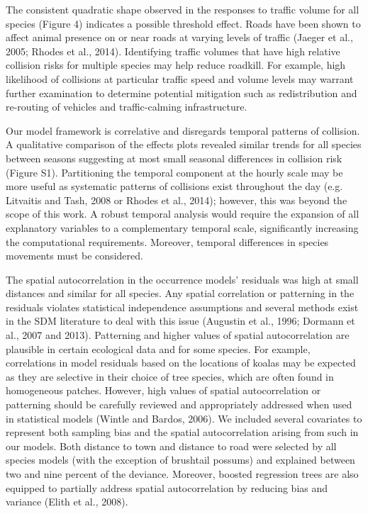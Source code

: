 The consistent quadratic shape observed in the responses to traffic volume for all species (Figure 4) indicates a possible threshold effect.  Roads have been shown to affect animal presence on or near roads at varying levels of traffic (Jaeger et al., 2005; Rhodes et al., 2014).  Identifying traffic volumes that have high relative collision risks for multiple species may help reduce roadkill.  For example, high likelihood of collisions at particular traffic speed and volume levels may warrant further examination to determine potential mitigation such as redistribution and re-routing of vehicles and traffic-calming infrastructure.

Our model framework is correlative and disregards temporal patterns of collision.  A qualitative comparison of the effects plots revealed similar trends for all species between seasons suggesting at most small seasonal differences in collision risk (Figure S1). Partitioning the temporal component at the hourly scale may be more useful as systematic patterns of collisions exist throughout the day (e.g. Litvaitis and Tash, 2008 or Rhodes et al., 2014); however, this was beyond the scope of this work.  A robust temporal analysis would require the expansion of all explanatory variables to a complementary temporal scale, significantly increasing the computational requirements.  Moreover, temporal differences in species movements  must be considered.

The spatial autocorrelation in the occurrence models' residuals was high at small distances and similar for all species.  Any spatial correlation or patterning in the residuals violates statistical independence assumptions and several methods exist in the SDM literature to deal with this issue (Augustin et al., 1996; Dormann et al., 2007 and 2013).  Patterning and higher values of spatial autocorrelation are plausible in certain ecological data and for some species.  For example, correlations in model residuals based on the locations of koalas may be expected as they are selective in their choice of tree species, which are often found in homogeneous patches.  However, high values of spatial autocorrelation or patterning should be carefully reviewed and appropriately addressed when used in statistical models (Wintle and Bardos, 2006).  We included several covariates to represent both sampling bias and the spatial autocorrelation arising from such in our models.  Both distance to town and distance to road were selected by all species models (with the exception of brushtail possums) and explained between two and nine percent of the deviance.  Moreover, boosted regression trees are also equipped to partially address spatial autocorrelation by reducing bias and variance (Elith et al., 2008).


